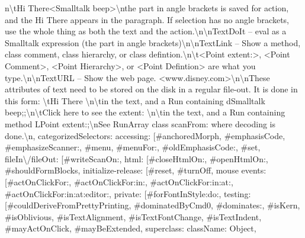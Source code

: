 {n\allowbreak\textbackslash tHi There<Smalltalk beep>\allowbreak\textbackslash nthe part in angle brackets is saved for action, and the Hi There appears in the paragraph.  If selection has no angle brackets, use the whole thing as both the text and the action.\allowbreak\textbackslash n\allowbreak\textbackslash nTextDoIt  --  eval as a Smalltalk expression (the part in angle brackets)\allowbreak\textbackslash n\allowbreak\textbackslash nTextLink -- Show a method, class comment, class hierarchy, or class defintion.\allowbreak\textbackslash n\allowbreak\textbackslash t<Point extent:>, <Point Comment>, <Point Hierarchy>, or <Point Defintion> are what you type.\allowbreak\textbackslash n\allowbreak\textbackslash nTextURL -- Show the web page. <www.disney.com>\allowbreak\textbackslash n\allowbreak\textbackslash nThese attributes of text need to be stored on the disk in a regular file-out.  It is done in this form: \allowbreak\textbackslash tHi There   \allowbreak\textbackslash n\allowbreak\textbackslash tin the text, and a Run containing   dSmalltalk beep;;\allowbreak\textbackslash n\allowbreak\textbackslash tClick here to see the extent:   \allowbreak\textbackslash n\allowbreak\textbackslash tin the text, and a Run containing   method LPoint extent:;\allowbreak\textbackslash nSee RunArray class scanFrom: where decoding is done.\allowbreak\textbackslash n\textquotedbl{}, \textquotedbl{}categorizedSelectors\textquotedbl{}: \textbraceleft \textquotedbl{}accessing\textquotedbl{}: {[}\textquotedbl{}\#anchoredMorph\textquotedbl{}, \textquotedbl{}\#emphasisCode\textquotedbl{}, \textquotedbl{}\#emphasizeScanner:\textquotedbl{}, \textquotedbl{}\#menu\textquotedbl{}, \textquotedbl{}\#menuFor:\textquotedbl{}, \textquotedbl{}\#oldEmphasisCode:\textquotedbl{}, \textquotedbl{}\#set\textquotedbl{}{]}, \textquotedbl{}fileIn\allowbreak\textbackslash /fileOut\textquotedbl{}: {[}\textquotedbl{}\#writeScanOn:\textquotedbl{}{]}, \textquotedbl{}html\textquotedbl{}: {[}\textquotedbl{}\#closeHtmlOn:\textquotedbl{}, \textquotedbl{}\#openHtmlOn:\textquotedbl{}, \textquotedbl{}\#shouldFormBlocks\textquotedbl{}{]}, \textquotedbl{}initialize-release\textquotedbl{}: {[}\textquotedbl{}\#reset\textquotedbl{}, \textquotedbl{}\#turnOff\textquotedbl{}{]}, \textquotedbl{}mouse events\textquotedbl{}: {[}\textquotedbl{}\#actOnClickFor:\textquotedbl{}, \textquotedbl{}\#actOnClickFor:in:\textquotedbl{}, \textquotedbl{}\#actOnClickFor:in:at:\textquotedbl{}, \textquotedbl{}\#actOnClickFor:in:at:editor:\textquotedbl{}{]}, \textquotedbl{}private\textquotedbl{}: {[}\textquotedbl{}\#forFontInStyle:do:\textquotedbl{}{]}, \textquotedbl{}testing\textquotedbl{}: {[}\textquotedbl{}\#couldDeriveFromPrettyPrinting\textquotedbl{}, \textquotedbl{}\#dominatedByCmd0\textquotedbl{}, \textquotedbl{}\#dominates:\textquotedbl{}, \textquotedbl{}\#isKern\textquotedbl{}, \textquotedbl{}\#isOblivious\textquotedbl{}, \textquotedbl{}\#isTextAlignment\textquotedbl{}, \textquotedbl{}\#isTextFontChange\textquotedbl{}, \textquotedbl{}\#isTextIndent\textquotedbl{}, \textquotedbl{}\#mayActOnClick\textquotedbl{}, \textquotedbl{}\#mayBeExtended\textquotedbl{}{]}\textbraceright , \textquotedbl{}superclass\textquotedbl{}: \textbraceleft \textquotedbl{}className\textquotedbl{}: \textquotedbl{}Object\textquotedbl{}\textbraceright , }
